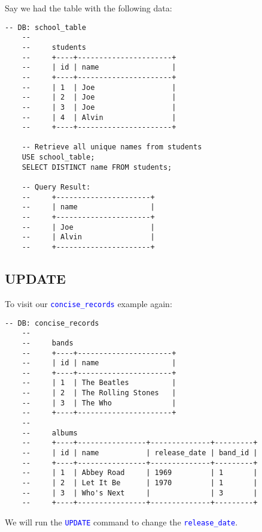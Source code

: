 \newpage
\noindent
Say we had the table with the following data:

\begin{lstlisting}[style=sql]
    -- DB: school_table
    --
    --     students
    --     +----+----------------------+
    --     | id | name                 |
    --     +----+----------------------+
    --     | 1  | Joe                  |
    --     | 2  | Joe                  |
    --     | 3  | Joe                  |
    --     | 4  | Alvin                |
    --     +----+----------------------+

    -- Retrieve all unique names from students
    USE school_table;
    SELECT DISTINCT name FROM students;

    -- Query Result:
    --     +----------------------+
    --     | name                 |
    --     +----------------------+
    --     | Joe                  |
    --     | Alvin                |
    --     +----------------------+
\end{lstlisting}

\subsection*{UPDATE}
\noindent
To visit our \textcolor{blue}{\texttt{concise\_records}} example again:

\begin{lstlisting}[style=sql]
    -- DB: concise_records
    --
    --     bands
    --     +----+----------------------+
    --     | id | name                 |
    --     +----+----------------------+
    --     | 1  | The Beatles          |
    --     | 2  | The Rolling Stones   |
    --     | 3  | The Who              |
    --     +----+----------------------+
    --    
    --     albums
    --     +----+----------------+--------------+---------+
    --     | id | name           | release_date | band_id |
    --     +----+----------------+--------------+---------+
    --     | 1  | Abbey Road     | 1969         | 1       |
    --     | 2  | Let It Be      | 1970         | 1       |
    --     | 3  | Who's Next     |              | 3       |
    --     +----+----------------+--------------+---------+
\end{lstlisting}

\vspace{1em}
\noindent
We will run the \textcolor{blue}{\texttt{UPDATE}} command to change the \textcolor{blue}{\texttt{release\_date}}.

\newpage

